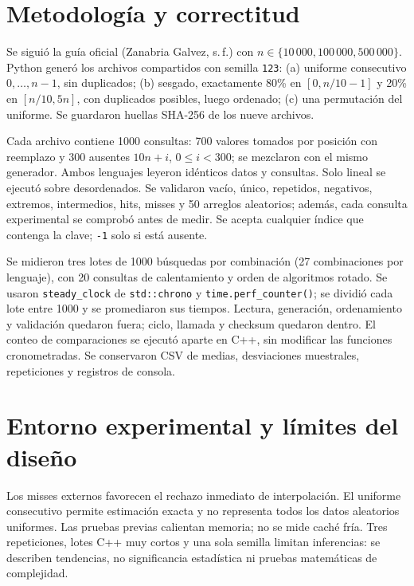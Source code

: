 \documentclass[10pt,a4paper]{article}
\begin{document}
\section{Metodología y correctitud}
Se siguió la guía oficial (Zanabria Galvez, s.\,f.) con $n\in\{10\,000,100\,000,500\,000\}$. Python generó los archivos compartidos con semilla \texttt{123}: (a) uniforme consecutivo $0,\ldots,n-1$, sin duplicados; (b) sesgado, exactamente 80\% en $[0,n/10-1]$ y 20\% en $[n/10,5n]$, con duplicados posibles, luego ordenado; (c) una permutación del uniforme. Se guardaron huellas SHA-256 de los nueve archivos.

Cada archivo contiene 1000 consultas: 700 valores tomados por posición con reemplazo y 300 ausentes $10n+i$, $0\leq i<300$; se mezclaron con el mismo generador. Ambos lenguajes leyeron idénticos datos y consultas. Solo lineal se ejecutó sobre desordenados. Se validaron vacío, único, repetidos, negativos, extremos, intermedios, hits, misses y 50 arreglos aleatorios; además, cada consulta experimental se comprobó antes de medir. Se acepta cualquier índice que contenga la clave; \texttt{-1} solo si está ausente.

Se midieron tres lotes de 1000 búsquedas por combinación (27 combinaciones por lenguaje), con 20 consultas de calentamiento y orden de algoritmos rotado. Se usaron \texttt{steady\_clock} de \texttt{std::chrono} y \texttt{time.perf\_counter()}; se dividió cada lote entre 1000 y se promediaron sus tiempos. Lectura, generación, ordenamiento y validación quedaron fuera; ciclo, llamada y checksum quedaron dentro. El conteo de comparaciones se ejecutó aparte en C++, sin modificar las funciones cronometradas. Se conservaron CSV de medias, desviaciones muestrales, repeticiones y registros de consola.
\section{Entorno experimental y límites del diseño}


Los misses externos favorecen el rechazo inmediato de interpolación. El uniforme consecutivo permite estimación exacta y no representa todos los datos aleatorios uniformes. Las pruebas previas calientan memoria; no se mide caché fría. Tres repeticiones, lotes C++ muy cortos y una sola semilla limitan inferencias: se describen tendencias, no significancia estadística ni pruebas matemáticas de complejidad.
\newpage
\end{document}
